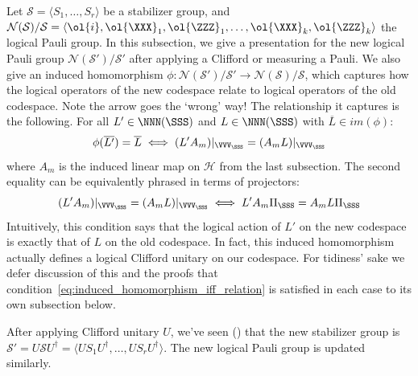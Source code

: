 Let $\mathcal{S} = \langle S_1, \ldots, S_r \rangle$ be a stabilizer group, and $\mathcal{N}(\mathcal{S})/\mathcal{S} = \langle \ol{i}, \ol{\XXX}_1, \ol{\ZZZ}_1, \ldots, \ol{\XXX}_k, \ol{\ZZZ}_k \rangle $ the logical Pauli group.
In this subsection, we give a presentation for the new logical Pauli group $\mathcal{N}(\mathcal{S}')/\mathcal{S}'$ after applying a Clifford or measuring a Pauli.
We also give an induced homomorphism $\phi: \mathcal{N}(\mathcal{S}')/\mathcal{S}' \to \mathcal{N}(\mathcal{S})/\mathcal{S}$, which captures how the logical operators of the new codespace relate to logical operators of the old codespace.
Note the arrow goes the `wrong' way!
The relationship it captures is the following.
For all $L' \in \NNN(\SSS)$ and $L \in \NNN(\SSS)$ with $\overline{L} \in im(\phi)$:
\begin{equation}\label{eq:induced_homomorphism_iff_relation}
    \phi(\overline{L'}) = \overline{L} \iff (L' A_m)|_{\VVV_\SSS} = (A_m L)|_{\VVV_\SSS}
\end{equation}
where $A_m$ is the induced linear map on $\mathcal{H}$ from the last subsection.
The second equality can be equivalently phrased in terms of projectors:
\begin{equation}\label{eq:induced_homomorphism_iff_relation_via_projector}
    (L' A_m)|_{\VVV_\SSS} = (A_m L)|_{\VVV_\SSS} \iff L' A_m \Pi_{\SSS} = A_m L \Pi_{\SSS}
\end{equation}
Intuitively, this condition says that the logical action of $L'$ on the new codespace is exactly that of $L$ on the old codespace.
In fact, this induced homomorphism actually defines a logical Clifford unitary on our codespace.
For tidiness' sake we defer discussion of this and the proofs that condition~\eqref{eq:induced_homomorphism_iff_relation} is satisfied in each case to its own subsection below.

After applying Clifford unitary $U$, we've seen () that the new stabilizer group is $\mathcal{S}' = U\mathcal{S}U^\dagger = \langle U S_1 U^\dagger, \ldots, U S_r U^\dagger \rangle$.
The new logical Pauli group is updated similarly.

